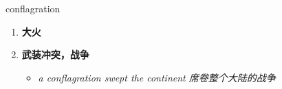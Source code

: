 
\begin{frame}
{\huge conflagration}
\begin{center}
\begin{enumerate}\Large
  \item \textbf{大火}
  \item \textbf{武装冲突，战争}
  \begin{itemize}
    \item \em{\Large{a conflagration swept the continent 席卷整个大陆的战争}}
  \end{itemize}
\end{enumerate}
\end{center}
\end{frame}
